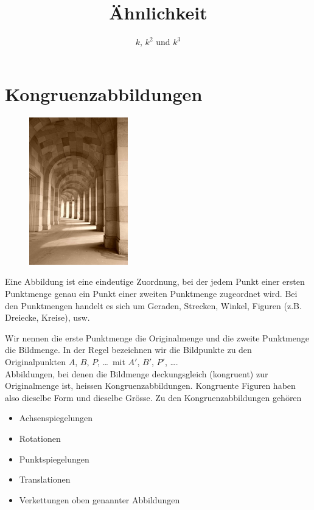 \documentclass[%
11pt,%
twoside,%
titlepage,%
a4page,%
headsepline%
]{scrartcl}
\title{Ähnlichkeit}
\subtitle{$k$, $k^2$ und $k^3$}
\author{}
\date{}
\begin{document}
\maketitle

\cleardoublepage

\tableofcontents
\cleardoublepage

\section{Kongruenzabbildungen}
\begin{figure}
  \begin{center}
    \includegraphics[width=0.382\textwidth]{pictures/torbogen}
  \end{center}
\end{figure}
Eine Abbildung ist eine eindeutige Zuordnung, bei der jedem Punkt einer ersten Punktmenge genau ein Punkt einer zweiten Punktmenge zugeordnet wird. Bei den Punktmengen handelt es sich um Geraden, Strecken, Winkel, Figuren (z.B. Dreiecke, Kreise), usw.

Wir nennen die erste Punktmenge die Originalmenge und die zweite Punktmenge die Bildmenge. In der Regel bezeichnen wir die Bildpunkte zu den Originalpunkten $A$, $B$, $P$, \dots\ mit $A'$, $B'$, $P'$, \dots.\\

Abbildungen, bei denen die Bildmenge deckungsgleich (kongruent) zur Originalmenge ist, heissen Kongruenzabbildungen. Kongruente Figuren haben also dieselbe Form und dieselbe Gr\"osse. Zu den Kongruenzabbildungen geh\"oren
\begin{itemize}
\item Achsenspiegelungen
\item Rotationen
\item Punktspiegelungen
\item Translationen
\item Verkettungen oben genannter Abbildungen
\end{itemize}
\end{document}
